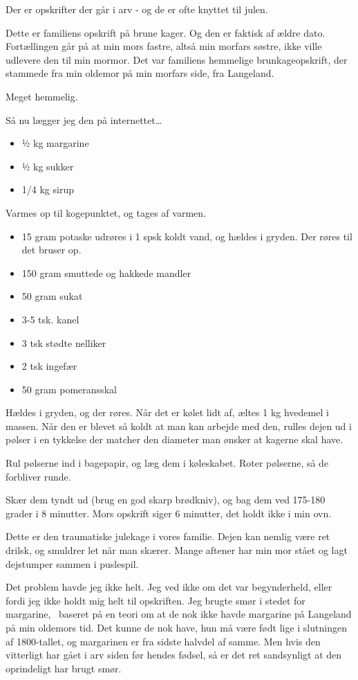 \documentclass[
  letterpaper,
  DIV=11,
  numbers=noendperiod]{scrreprt}
\providecommand{\tightlist}{%
  \setlength{\itemsep}{0pt}\setlength{\parskip}{0pt}}\usepackage{longtable,booktabs,array}
\begin{document}
Der er opskrifter der går i arv - og de er ofte knyttet til julen.

Dette er familiens opskrift på brune kager. Og den er faktisk af ældre
dato. Fortællingen går på at min mors fastre, altså min morfars søstre,
ikke ville udlevere den til min mormor. Det var familiens hemmelige
brunkageopskrift, der stammede fra min oldemor på min morfars side, fra
Langeland.

Meget hemmelig.

Så nu lægger jeg den på internettet\ldots{}

\begin{itemize}
\tightlist
\item
  ½ kg margarine
\item
  ½ kg sukker
\item
  1/4 kg sirup
\end{itemize}

Varmes op til kogepunktet, og tages af varmen.

\begin{itemize}
\tightlist
\item
  15 gram potaske udrøres i 1 spsk koldt vand, og hældes i gryden. Der
  røres til det bruser op.
\item
  150 gram smuttede og hakkede mandler
\item
  50 gram sukat
\item
  3-5 tsk. kanel
\item
  3 tsk stødte nelliker
\item
  2 tsk ingefær
\item
  50 gram pomeransskal
\end{itemize}

Hældes i gryden, og der røres. Når det er kølet lidt af, æltes 1 kg
hvedemel i massen. Når den er blevet så koldt at man kan arbejde med
den, rulles dejen ud i pølser i en tykkelse der matcher den diameter man
ønsker at kagerne skal have.

Rul pølserne ind i bagepapir, og læg dem i køleskabet. Roter pølserne,
så de forbliver runde.

Skær dem tyndt ud (brug en god skarp brødkniv), og bag dem ved 175-180
grader i 8 minutter. Mors opskrift siger 6 minutter, det holdt ikke i
min ovn.

Dette er den traumatiske julekage i vores familie. Dejen kan nemlig være
ret drilsk, og smuldrer let når man skærer. Mange aftener har min mor
stået og lagt dejstumper sammen i puslespil.

Det problem havde jeg ikke helt. Jeg ved ikke om det var begynderheld,
eller fordi jeg ikke holdt mig helt til opskriften. Jeg brugte smør i
stedet for margarine,~ baseret på en teori om at de nok ikke havde
margarine på Langeland på min oldemors tid. Det kunne de nok have, hun
må være født lige i slutningen af 1800-tallet, og margarinen er fra
sidste halvdel af samme. Men hvis den vitterligt har gået i arv siden
før hendes fødsel, så er det ret sandsynligt at den oprindeligt har
brugt smør.
\end{document}
